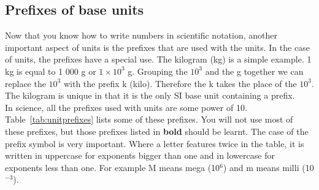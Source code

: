 \subsection*{Prefixes of base units}
            \nopagebreak
Now that you know how to write numbers in scientific notation, another important aspect of units is the prefixes that are used with the units. In the case of units, the prefixes have a special use. The kilogram (kg) is a simple example. 1 kg is equal to 1 000 g or $1\ensuremath{\times}{10}^{3}$ g. Grouping the ${10}^{3}$ and the g together we can replace the ${10}^{3}$ with the prefix k (kilo). Therefore the k takes the place of the ${10}^{3}$. The kilogram is unique in that it is the only SI base unit containing a prefix.\\
In science, all the prefixes used with units are some power of 10. Table~\ref{tab:unitprefixes} lists some of these prefixes. You will not use most of these prefixes, but those prefixes listed in \textbf{bold} should be learnt. The case of the prefix symbol is very important. Where a letter features twice in the table, it is written in uppercase for exponents bigger than one and in lowercase for exponents less than one. For example M means mega (10${}^{6}$) and m means milli (10${}^{-3}$).
